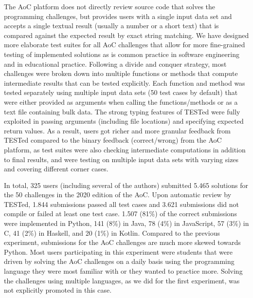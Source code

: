 \documentclass[../main]{subfiles}
\begin{document}
The AoC platform does not directly review source code that solves the programming challenges, but provides users with a single input data set and accepts a single textual result (usually a number or a short text) that is compared against the expected result by exact string matching.
We have designed more elaborate test suites for all AoC challenges that allow for more fine-grained testing of implemented solutions as is common practice in software engineering and in educational practice.
Following a divide and conquer strategy, most challenges were broken down into multiple functions or methods that compute intermediate results that can be tested explicitly.
Each function and method was tested separately using multiple input data sets (50 test cases by default) that were either provided as arguments when calling the functions/methods or as a text file containing bulk data.
The strong typing features of TESTed were fully exploited in passing arguments (including file locations) and specifying expected return values.
As a result, users got richer and more granular feedback from TESTed compared to the binary feedback (correct/wrong) from the AoC platform, as test suites were also checking intermediate computations in addition to final results, and were testing on multiple input data sets with varying sizes and covering different corner cases.

In total, 325 users (including several of the authors) submitted 5.465 solutions for the 50 challenges in the 2020 edition of the AoC. Upon automatic review by TESTed, 1.844 submissions passed all test cases and 3.621 submissions did not compile or failed at least one test case.
1.507 (81\%) of the correct submissions were implemented in Python, 141 (8\%) in Java, 78 (4\%) in JavaScript, 57 (3\%) in C, 41 (2\%) in Haskell, and 20 (1\%) in Kotlin.
Compared to the previous experiment, submissions for the AoC challenges are much more skewed towards Python.
Most users participating in this experiment were students that were driven by solving the AoC challenges on a daily basis using the programming language they were most familiar with or they wanted to practice more.
Solving the challenges using multiple languages, as we did for the first experiment, was not explicitly promoted in this case.
\end{document}
